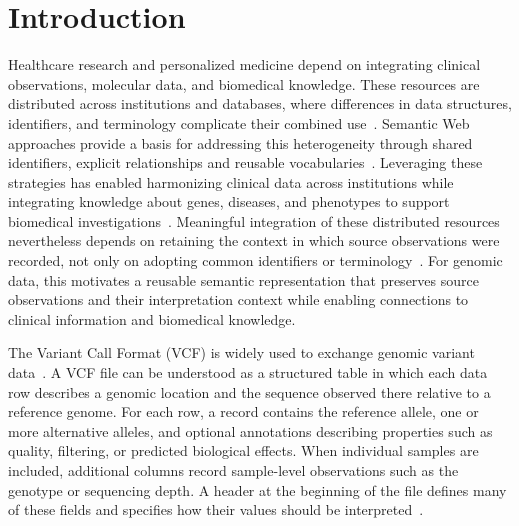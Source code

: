 \section{Introduction}

Healthcare research and personalized medicine depend on integrating clinical observations, molecular data, and biomedical knowledge.
These resources are distributed across institutions and databases, where differences in data structures, identifiers, and terminology complicate their combined use~\cite{gaudetblavignac2021sphn,putman2024monarch}.
Semantic Web approaches provide a basis for addressing this heterogeneity through shared identifiers, explicit relationships and reusable vocabularies~\cite{smith2007obo,belleau2008bio2rdf}.
Leveraging these strategies has enabled harmonizing clinical data across institutions while integrating knowledge about genes, diseases, and phenotypes to support biomedical investigations~\cite{gaudetblavignac2021sphn,putman2024monarch}.
Meaningful integration of these distributed resources nevertheless depends on retaining the context in which source observations were recorded, not only on adopting common identifiers or terminology~\cite{gaudetblavignac2021sphn}.
For genomic data, this motivates a reusable semantic representation that preserves source observations and their interpretation context while enabling connections to clinical information and biomedical knowledge.

The Variant Call Format (VCF) is widely used to exchange genomic variant data~\cite{danecek2011vcf}.
A VCF file can be understood as a structured table in which each data row describes a genomic location and the sequence observed there relative to a reference genome.
For each row, a record contains the reference allele, one or more alternative alleles, and optional annotations describing properties such as quality, filtering, or predicted biological effects.
When individual samples are included, additional columns record sample-level observations such as the genotype or sequencing depth.
A header at the beginning of the file defines many of these fields and specifies how their values should be interpreted~\cite{vcf45}.

